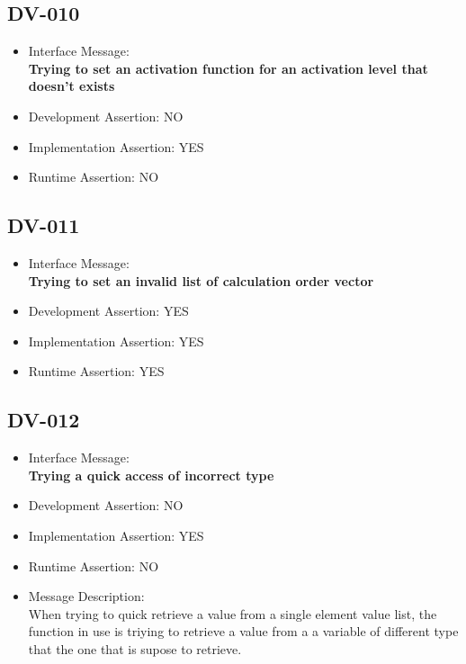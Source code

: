 \subsection{DV-010}
\begin{itemize}
  \item Interface Message:\\[1em]
    \textbf{Trying to set an activation function for an activation level that doesn't exists}
  \item Development Assertion: NO
  \item Implementation Assertion: YES
  \item Runtime Assertion: NO
\end{itemize}

\subsection{DV-011}
\begin{itemize}
  \item Interface Message:\\[1em]
    \textbf{Trying to set an invalid list of calculation order vector}
  \item Development Assertion: YES
  \item Implementation Assertion: YES
  \item Runtime Assertion: YES
\end{itemize}

\subsection{DV-012}
\begin{itemize}
  \item Interface Message:\\[1em]
    \textbf{Trying a quick access of incorrect type}
  \item Development Assertion: NO
  \item Implementation Assertion: YES
  \item Runtime Assertion: NO
  \item Message Description:\\[1em]
    When trying to quick retrieve a value from a single element value list, the function in use is triying to retrieve a value from a a variable of different type that the one that is supose to retrieve.
\end{itemize}


